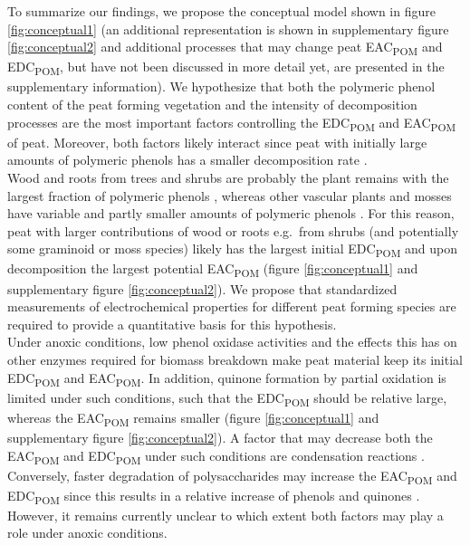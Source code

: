 \documentclass[alpha-refs, lineno]{wiley-article-rmd}
\begin{document}
To summarize our findings, we propose the conceptual model shown in figure \ref{fig:conceptual1} (an additional representation is shown in supplementary figure \ref{fig:conceptual2} and additional processes that may change peat EAC\textsubscript{POM} and EDC\textsubscript{POM}, but have not been discussed in more detail yet, are presented in the supplementary information). We hypothesize that both the polymeric phenol content of the peat forming vegetation and the intensity of decomposition processes are the most important factors controlling the EDC\textsubscript{POM} and EAC\textsubscript{POM} of peat. Moreover, both factors likely interact since peat with initially large amounts of polymeric phenols has a smaller decomposition rate \autocite{Bengtsson.2018}.\\
Wood and roots from trees and shrubs are probably the plant remains with the largest fraction of polymeric phenols \autocite{Benner.1984,Williams.1998,Strakova.2010,Hodgkins.2018}, whereas other vascular plants and mosses have variable and partly smaller amounts of polymeric phenols \autocite{Williams.1998,Scheffer.2001,Strakova.2010,Bengtsson.2018,Zak.2019}. For this reason, peat with larger contributions of wood or roots e.g.~from shrubs (and potentially some graminoid or moss species) likely has the largest initial EDC\textsubscript{POM} and upon decomposition the largest potential EAC\textsubscript{POM} (figure \ref{fig:conceptual1} and supplementary figure \ref{fig:conceptual2}). We propose that standardized measurements of electrochemical properties for different peat forming species are required to provide a quantitative basis for this hypothesis.\\
Under anoxic conditions, low phenol oxidase activities and the effects this has on other enzymes required for biomass breakdown \autocite{Fenner.2011} make peat material keep its initial EDC\textsubscript{POM} and EAC\textsubscript{POM}. In addition, quinone formation by partial oxidation is limited under such conditions, such that the EDC\textsubscript{POM} should be relative large, whereas the EAC\textsubscript{POM} remains smaller (figure \ref{fig:conceptual1} and supplementary figure \ref{fig:conceptual2}). A factor that may decrease both the EAC\textsubscript{POM} and EDC\textsubscript{POM} under such conditions are condensation reactions \autocite{Hotta.2002,Uchimiya.2009,Bolton.2018,Zhao.2020,Olk.2006,Heitmann.2006,Yu.2016}. Conversely, faster degradation of polysaccharides may increase the EAC\textsubscript{POM} and EDC\textsubscript{POM} since this results in a relative increase of phenols and quinones \autocite{Benner.1984}. However, it remains currently unclear to which extent both factors may play a role under anoxic conditions.
\end{document}
